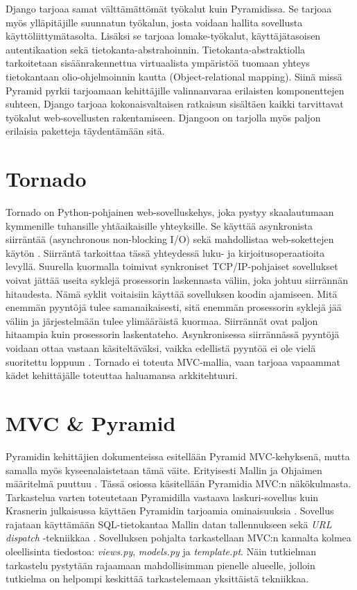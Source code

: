 \documentclass[utf8]{gradu3}
\begin{document}
Django tarjoaa samat välttämättömät työkalut kuin Pyramidissa. Se tarjoaa myös ylläpitäjille suunnatun työkalun, josta voidaan hallita sovellusta käyttöliittymätasolta. Lisäksi se tarjoaa lomake-työkalut, käyttäjätasoisen autentikaation sekä tietokanta-abstrahoinnin. Tietokanta-abstraktiolla tarkoitetaan sisäänrakennettua virtuaalista ympäristöä tuomaan yhteys tietokantaan olio-ohjelmoinnin kautta (Object-relational mapping)\parencite{djangobook}. Siinä missä Pyramid pyrkii tarjoamaan kehittäjille valinnanvaraa erilaisten komponenttejen suhteen, Django tarjoaa kokonaisvaltaisen ratkaisun sisältäen kaikki tarvittavat työkalut web-sovellusten rakentamiseen. Djangoon on tarjolla myös paljon erilaisia paketteja täydentämään sitä. 

\section{Tornado}
Tornado on Python-pohjainen web-sovelluskehys, joka pystyy skaalautumaan kymmenille tuhansille yhtäaikaisille yhteyksille. Se käyttää asynkronista siirräntää (asynchronous non-blocking I/O) sekä mahdollistaa web-sokettejen käytön \parencite{tornado}. Siirräntä tarkoittaa tässä yhteydessä luku- ja kirjoitusoperaatioita levyllä. Suurella kuormalla toimivat synkroniset TCP/IP-pohjaiset sovellukset voivat jättää useita syklejä prosessorin laskennasta väliin, joka johtuu siirrännän hitaudesta. Nämä syklit voitaisiin käyttää sovelluksen koodin ajamiseen. Mitä enemmän pyyntöjä tulee samanaikaisesti, sitä enemmän prosessorin syklejä jää väliin ja järjestelmään tulee ylimääräistä kuormaa. Siirrännät ovat paljon hitaampia kuin prosessorin laskentateho. Asynkronisessa siirrännässä pyyntöjä voidaan ottaa vastaan käsiteltäväksi, vaikka edellistä pyyntöä ei ole vielä suoritettu loppuun \parencite[s. 1]{async}. Tornado ei toteuta MVC-mallia, vaan tarjoaa vapaammat kädet kehittäjälle toteuttaa haluamansa arkkitehtuuri. 

\section{MVC \& Pyramid}
Pyramidin kehittäjien dokumenteissa esitellään Pyramid MVC-kehyksenä, mutta samalla myös kyseenalaistetaan tämä väite. Erityisesti Mallin ja Ohjaimen määritelmä puuttuu \parencite{pyramid_intr}. Tässä
osiossa käsitellään Pyramidia MVC:n näkökulmasta. Tarkastelua varten toteutetaan Pyramidilla vastaava laskuri-sovellus kuin Krasnerin julkaisussa käyttäen Pyramidin tarjoamia ominaisuuksia \parencite{krasner_desc}. Sovellus rajataan käyttämään SQL-tietokantaa Mallin datan tallennukseen sekä \emph{URL dispatch} -tekniikkaa \parencite{urldispatch}. Sovelluksen pohjalta tarkastellaan MVC:n kannalta kolmea oleellisinta tiedostoa: \emph{views.py}, \emph{models.py} ja \emph{template.pt}. Näin tutkielman tarkastelu pystytään rajaamaan mahdollisimman pienelle alueelle, jolloin tutkielma on helpompi keskittää tarkastelemaan yksittäistä tekniikkaa.
\end{document}
